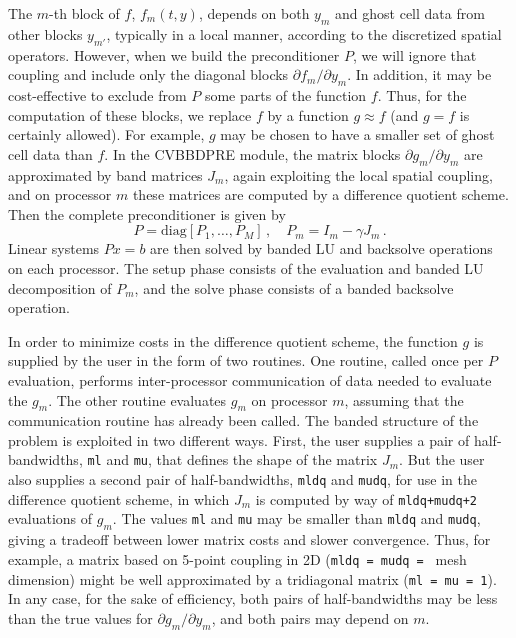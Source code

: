 The $m$-th block of $f$, $f_m(t,y)$, depends on both $y_m$ and ghost
cell data from other blocks $y_{m'}$, typically in a local manner,
according to the discretized spatial operators.  However, when we
build the preconditioner $P$, we will ignore that coupling and
include only the diagonal blocks $\partial f_m / \partial y_m$.  In
addition, it may be cost-effective to exclude from $P$ some parts of
the function $f$.  Thus, for the computation of these blocks, we
replace $f$ by a function $g \approx f$ (and $g = f$ is certainly
allowed).  For example, $g$ may be chosen to have a smaller set of ghost
cell data than $f$.  In the CVBBDPRE module, the matrix blocks
$\partial g_m/\partial y_m$ are approximated by band matrices $J_m$,
again exploiting the local spatial coupling, and on processor $m$
these matrices
are computed by a difference quotient scheme.  Then the complete
preconditioner is given by
\begin{equation*}
  P = \mbox{diag}[P_1,\ldots,P_M] \, , \quad
  P_m = I_m - \gamma J_m \, .
\end{equation*}
Linear systems $Px = b$ are then solved by banded LU and backsolve
operations on each processor.  The setup phase consists of the
evaluation and banded LU decomposition of $P_m$, and the solve phase
consists of a banded backsolve operation.

In order to minimize costs in the difference quotient scheme, the
function $g$ is supplied by the user in the form of two routines.  One
routine, called once per $P$ evaluation, performs inter-processor
communication of data needed to evaluate the $g_m$.  The other routine
evaluates $g_m$ on processor $m$, assuming that the communication
routine has already been called.  The banded structure of the problem
is exploited in two different ways.  First, the user supplies a pair of
half-bandwidths, {\tt ml} and {\tt mu}, that defines the shape of the
matrix $J_m$.  But the user also supplies a second pair of
half-bandwidths, {\tt mldq} and {\tt mudq}, for use in the difference
quotient scheme, in which $J_m$ is computed by way of
{\tt mldq+mudq+2} evaluations of $g_m$.  The values {\tt ml} and {\tt mu}
may be smaller than {\tt mldq} and {\tt mudq}, giving a tradeoff between
lower matrix costs and slower convergence.  Thus, for example, a matrix
based on 5-point coupling in
2D ({\tt mldq = mudq = } mesh dimension) might be well approximated by
a tridiagonal matrix ({\tt ml = mu = 1}).  In any case, for the sake
of efficiency, both pairs of half-bandwidths may be less than the true
values for $\partial g_m /\partial y_m$, and both pairs may depend on
$m$.

